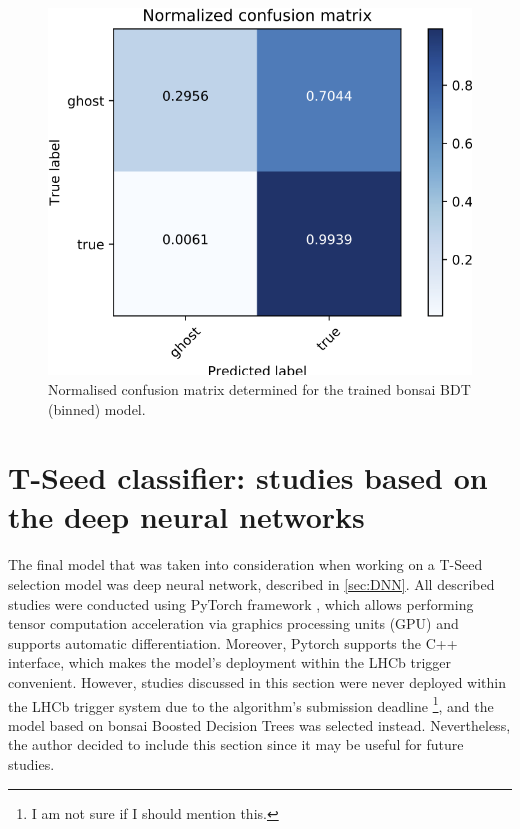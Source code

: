 \begin{figure}
\centering
\hspace*{-1cm}\includegraphics[scale=0.6]{figures/bBDT_normalized_cm.png}
\caption{Normalised confusion matrix determined for the trained bonsai BDT (binned) model.}
\label{fig:CM normalized}
\end{figure}

\section{T-Seed classifier: studies based on the deep neural networks}

The final model that was taken into consideration when working on a T-Seed selection model was deep neural network, described in \ref{sec:DNN}. 
All described studies were conducted using PyTorch framework \cite{pytorch}, which allows performing tensor computation acceleration via graphics processing units (GPU) and supports automatic differentiation. Moreover, Pytorch supports the C++ interface, which makes the model's deployment within the LHCb trigger convenient. 
However, studies discussed in this section were never deployed within the LHCb trigger system due to the algorithm's submission deadline \footnote{I am not sure if I should mention this.}, and the model based on bonsai Boosted Decision Trees was selected instead.  Nevertheless, the author decided to include this section since it may be useful for future studies. 
 
